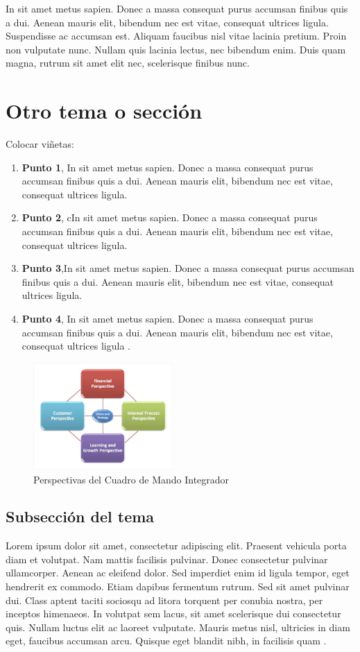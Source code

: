 \documentclass[letterpaper, 12pt, spanish]{article}
\begin{document}
In sit amet metus sapien. Donec a massa consequat purus accumsan finibus quis a dui. Aenean mauris elit, bibendum nec est vitae, consequat ultrices ligula. Suspendisse ac accumsan est. Aliquam faucibus nisl vitae lacinia pretium. Proin non vulputate nunc. Nullam quis lacinia lectus, nec bibendum enim. Duis quam magna, rutrum sit amet elit nec, scelerisque finibus nunc.

\section{Otro tema o sección}
Colocar viñetas:
\begin{enumerate} %
 \item \textbf{Punto 1}, In sit amet metus sapien. Donec a massa consequat purus accumsan finibus quis a dui. Aenean mauris elit, bibendum nec est vitae, consequat ultrices ligula.
 \item \textbf{Punto 2}, cIn sit amet metus sapien. Donec a massa consequat purus accumsan finibus quis a dui. Aenean mauris elit, bibendum nec est vitae, consequat ultrices ligula.
 \item \textbf{Punto 3},In sit amet metus sapien. Donec a massa consequat purus accumsan finibus quis a dui. Aenean mauris elit, bibendum nec est vitae, consequat ultrices ligula.
 \item \textbf{Punto 4}, In sit amet metus sapien. Donec a massa consequat purus accumsan finibus quis a dui. Aenean mauris elit, bibendum nec est vitae, consequat ultrices ligula \cite{marr2015}.
\end{enumerate}

\begin{figure}[H]
\begin{center}
  \includegraphics[width=200px]{./images/bsc1.jpg}
  \caption{Perspectivas del Cuadro de Mando Integrador}
\end{center}
\end{figure}

\subsection{Subsección del tema}
Lorem ipsum dolor sit amet, consectetur adipiscing elit. Praesent vehicula porta diam et volutpat. Nam mattis facilisis pulvinar. Donec consectetur pulvinar ullamcorper. Aenean ac eleifend dolor. Sed imperdiet enim id ligula tempor, eget hendrerit ex commodo. Etiam dapibus fermentum rutrum. Sed sit amet pulvinar dui. Class aptent taciti sociosqu ad litora torquent per conubia nostra, per inceptos himenaeos. In volutpat sem lacus, sit amet scelerisque dui consectetur quis. Nullam luctus elit ac laoreet vulputate. Mauris metus nisl, ultricies in diam eget, faucibus accumsan arcu. Quisque eget blandit nibh, in facilisis quam \cite{baraybar2011}.
\end{document}
